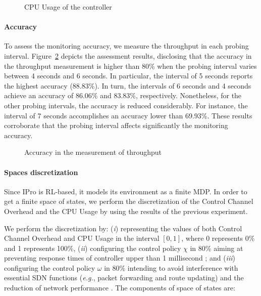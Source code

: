 \begin{figure}[h!]
    \centering
    
    \caption{CPU Usage of the controller}
    \label{fig:cpu_behavior}
\end{figure}

\paragraph{\textbf{Accuracy}}
To assess the monitoring accuracy, we measure the throughput in each probing interval. Figure~\ref{fig:throughput} depicts the assessment results, disclosing that the accuracy in the throughput measurement is higher than 80\% when the probing interval varies between 4 seconds and 6 seconds. In particular, the interval of 5 seconds reports the highest accuracy (88.83\%). In turn, the intervals of 6 seconds and 4 seconds achieve an accuracy of 86.06\% and 83.83\%, respectively. Nonetheless, for the other probing intervals, the accuracy is reduced considerably. For instance, the interval of 7 seconds accomplishes an accuracy lower than 69.93\%. These results corroborate that the probing interval affects significantly the monitoring accuracy.

\begin{figure}[h!]
    \centering
    
    \caption{Accuracy in the measurement of throughput }
    \label{fig:throughput}
\end{figure}

\paragraph{\textbf{Spaces discretization}}
Since IPro is RL-based, it models its environment as a finite MDP. In order to get a finite space of states, we perform the discretization of the Control Channel Overhead and the CPU Usage by using the results of the previous experiment.

\begin{comment}
\begin{figure}[h!]
    \centering
    
    \caption{Latency and Jitter}
    \label{fig:delay_jitter}
\end{figure}
\end{comment}

We perform the discretization by: (\textit{i}) representing the values of both Control Channel Overhead and CPU Usage in the interval $\left [ 0,1 \right ]$, where 0 represents 0\% and 1 represents 100\%, (\textit{ii}) configuring the control policy $\chi$ in 80\% aiming at preventing response times of controller upper than 1 millisecond \cite{repas_2015:performance_cpu}; and (\textit{iii}) configuring the control policy $\omega$ in 80\% intending to avoid interference with essential SDN functions (\textit{e.g.}, packet forwarding and route updating) and the reduction of network performance \cite{xu_2017:wildcard_requests}. The components of space of states are:

